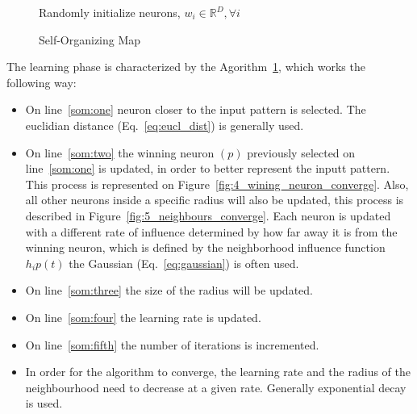 \begin{figure}[h]
  \begin{algorithm}[H]
    \label{alg:som}
    \DontPrintSemicolon
    Randomly initialize neurons, $w_i \in \mathbb{R}^{D}, \forall i $ \;
      \caption{Self-Organizing Map \cite[]{Kohonen1990} }
  \end{algorithm}
\end{figure}

The learning phase is characterized by the Agorithm~\ref{alg:som}, which works the following way:
\begin{itemize}
  \item On line~\ref{som:one} neuron closer to the input pattern is selected. The euclidian distance (Eq.~\ref{eq:eucl_dist}) is generally used.
    
  \item On line~\ref{som:two} the winning neuron $(p)$ previously selected on line~\ref{som:one} is updated, in order to better represent the inputt pattern. This process is represented on Figure~\ref{fig:4_wining_neuron_converge}. Also, all other neurons inside a specific radius will also be updated, this process is described in Figure~\ref{fig:5_neighbours_converge}. Each neuron is updated with a different rate of influence determined by how far away it is from the winning neuron, which is defined by the neighborhood influence function $h_ip(t)$ the Gaussian (Eq.~\ref{eq:gaussian}) is often used. 
    
  \item On line~\ref{som:three} the size of the radius will be updated.
  \item On line~\ref{som:four} the learning rate is updated.
  \item On line~\ref{som:fifth} the number of iterations is incremented.
  \item In order for the algorithm to converge, the learning rate and the radius of the neighbourhood need to decrease at a given rate. Generally exponential decay is used.
\end{itemize}
 
